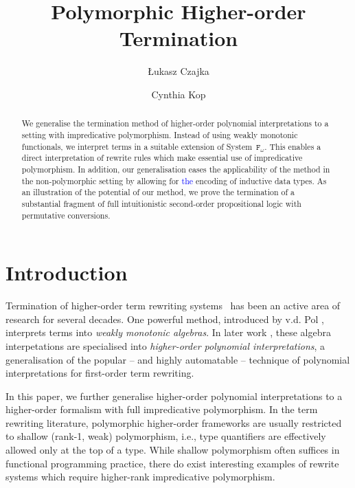\documentclass[a4paper,UKenglish,cleveref,autoref,numberwithinsect]{lipics-v2019}
\title{Polymorphic Higher-order Termination}
\author{{\L}ukasz Czajka}{Faculty of Informatics, TU Dortmund, Germany \and \url{http://www.mimuw.edu.pl/~lukaszcz/} }{lukaszcz@mimuw.edu.pl}{https://orcid.org/0000-0001-8083-4280}{}
\author{Cynthia Kop}{Institute of Computer Science, Radboud University Nijmegen, Netherlands \and \url{https://www.cs.ru.nl/~cynthiakop/}}{c.kop@cs.ru.nl}{https://orcid.org/0000-0002-6337-2544}{}
\theoremstyle{definition}
\newcommand{\Fomega}{\mathtt{F}_\omega}
\newcommand{\CKchange}[1]{\textcolor{blue}{#1}}
\begin{document}
\maketitle

\begin{abstract}
  We generalise the termination method of higher-order polynomial
  interpretations to a setting with impredicative
  polymorphism. Instead of using weakly monotonic functionals, we
  interpret terms in a suitable extension of System~$\Fomega$. This
  enables a direct interpretation of rewrite rules which make
  essential use of impredicative polymorphism.  In addition, our
  generalisation eases the applicability of the method in the
  non-polymorphic setting by allowing for \CKchange{the} encoding of inductive data
  types. As an illustration of the potential of our method, we prove
  the termination of a substantial fragment of full intuitionistic
  second-order propositional logic with permutative conversions.
\end{abstract}

\section{Introduction}

Termination of higher-order term rewriting
systems~\cite[Chapter~11]{Terese2003} has been an active area of
research for several decades.
One powerful method, introduced by v.d. Pol \cite{Pol1993,pol:96},
interprets terms into \emph{weakly monotonic algebras}.  In later work
\cite{FuhsKop2012,Kop2012}, these algebra interpetations are specialised
into \emph{higher-order polynomial interpretations}, a generalisation of
the popular -- and highly automatable -- technique of polynomial
interpretations for first-order term rewriting.

In this paper, we further generalise higher-order polynomial
interpretations to a higher-order formalism with full impredicative
polymorphism. In the term rewriting literature, polymorphic
higher-order frameworks are usually restricted to shallow (rank-1,
weak) polymorphism, i.e., type quantifiers are effectively allowed
only at the top of a type. While shallow polymorphism often suffices
in functional programming practice, there do exist interesting
examples of rewrite systems which require higher-rank impredicative
polymorphism.
\end{document}
